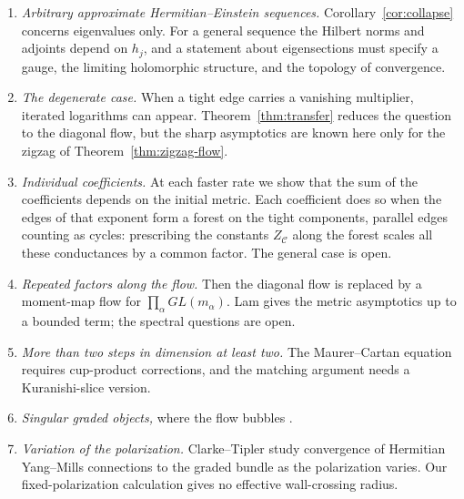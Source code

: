 \documentclass[11pt]{amsart}
\theoremstyle{definition}
\theoremstyle{remark}
\begin{document}
\begin{enumerate}
\item \emph{Arbitrary approximate Hermitian--Einstein sequences.}
 Corollary~\ref{cor:collapse} concerns eigenvalues only. For a general
 sequence the Hilbert norms and adjoints depend on $h_j$, and a statement
 about eigensections must specify a gauge, the limiting holomorphic
 structure, and the topology of convergence.
\item \emph{The degenerate case.} When a tight edge carries a vanishing
 multiplier, iterated logarithms can appear. Theorem~\ref{thm:transfer}
 reduces the question to the diagonal flow, but the sharp asymptotics are
 known here only for the zigzag of Theorem~\ref{thm:zigzag-flow}.
\item \emph{Individual coefficients.} At each faster rate we show that the
 sum of the coefficients depends on the initial metric. Each coefficient
 does so when the edges of that exponent form a forest on the tight
 components, parallel edges counting as cycles: prescribing the constants
 $Z_{\mathcal C}$ along the forest scales all these conductances by a common
 factor. The general case is open.
\item \emph{Repeated factors along the flow.} Then the diagonal flow is
 replaced by a moment-map flow for $\prod_\alpha GL(m_\alpha)$. Lam
 \cite{Lam2026} gives the metric asymptotics up to a bounded term; the
 spectral questions are open.
\item \emph{More than two steps in dimension at least two.} The
 Maurer--Cartan equation requires cup-product corrections, and the
 matching argument needs a Kuranishi-slice version.
\item \emph{Singular graded objects,} where the flow bubbles
 \cite{SibleyWentworth2015}.
\item \emph{Variation of the polarization.} Clarke--Tipler
 \cite{ClarkeTipler2023} study convergence of Hermitian Yang--Mills
 connections to the graded bundle as the polarization varies. Our
 fixed-polarization calculation gives no effective wall-crossing radius.
\end{enumerate}
\end{document}
